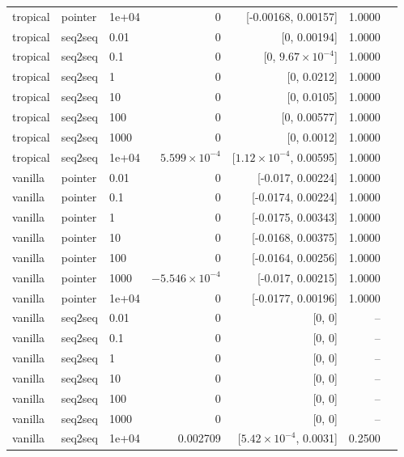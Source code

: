 \documentclass[10pt]{article}
\begin{document}
{\begin{longtable}{lllrrrl}
tropical & pointer & 1e+04 & 0 & [-0.00168, 0.00157] & 1.0000 & \\
tropical & seq2seq & 0.01 & 0 & [0, 0.00194] & 1.0000 & \\
tropical & seq2seq & 0.1 & 0 & [0, $9.67\times10^{-4}$] & 1.0000 & \\
tropical & seq2seq & 1 & 0 & [0, 0.0212] & 1.0000 & \\
tropical & seq2seq & 10 & 0 & [0, 0.0105] & 1.0000 & \\
tropical & seq2seq & 100 & 0 & [0, 0.00577] & 1.0000 & \\
tropical & seq2seq & 1000 & 0 & [0, 0.0012] & 1.0000 & \\
tropical & seq2seq & 1e+04 & $5.599\times10^{-4}$ & [$1.12\times10^{-4}$, 0.00595] & 1.0000 & \\
vanilla & pointer & 0.01 & 0 & [-0.017, 0.00224] & 1.0000 & \\
vanilla & pointer & 0.1 & 0 & [-0.0174, 0.00224] & 1.0000 & \\
vanilla & pointer & 1 & 0 & [-0.0175, 0.00343] & 1.0000 & \\
vanilla & pointer & 10 & 0 & [-0.0168, 0.00375] & 1.0000 & \\
vanilla & pointer & 100 & 0 & [-0.0164, 0.00256] & 1.0000 & \\
vanilla & pointer & 1000 & $-5.546\times10^{-4}$ & [-0.017, 0.00215] & 1.0000 & \\
vanilla & pointer & 1e+04 & 0 & [-0.0177, 0.00196] & 1.0000 & \\
vanilla & seq2seq & 0.01 & 0 & [0, 0] & -- & \\
vanilla & seq2seq & 0.1 & 0 & [0, 0] & -- & \\
vanilla & seq2seq & 1 & 0 & [0, 0] & -- & \\
vanilla & seq2seq & 10 & 0 & [0, 0] & -- & \\
vanilla & seq2seq & 100 & 0 & [0, 0] & -- & \\
vanilla & seq2seq & 1000 & 0 & [0, 0] & -- & \\
vanilla & seq2seq & 1e+04 & 0.002709 & [$5.42\times10^{-4}$, 0.0031] & 0.2500 & \\
\bottomrule
\end{longtable}
}
\end{document}

